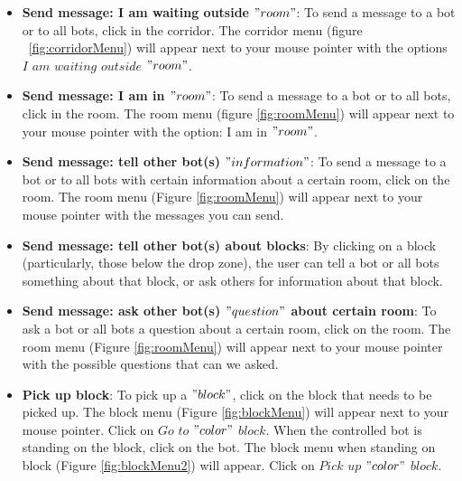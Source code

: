 \begin{itemize}
\item \textbf{Send message: I am waiting outside $"room"$}:
To send a message to a bot or to all bots, click in the corridor. The corridor menu (figure ~\ref{fig:corridorMenu}) will appear next to your mouse pointer with the options $I$ $am$ $waiting$ $outside$ $"room"$. 

\item \textbf{Send message: I am in $"room"$}:
To send a message to a bot or to all bots, click in the room. The room menu (figure \ref{fig:roomMenu}) will appear next to your mouse pointer with the option: I am in $"room"$. 

\item \textbf{Send message: tell other bot(s) $"information"$}:
To send a message to a bot or to all bots with certain information about a certain room, click on the room. The room menu (Figure \ref{fig:roomMenu}) will appear next to your mouse pointer with the messages you can send.

\item \textbf{Send message: tell other bot(s) about blocks}:
By clicking on a block (particularly, those below the drop zone), the user can tell a bot or all bots something about that block, or ask others for information about that block.

\item \textbf{Send message: ask other bot(s) $"question"$ about certain room}:
To ask a bot or all bots a question about a certain room, click on the room. The room menu (Figure \ref{fig:roomMenu}) will appear next to your mouse pointer with the possible questions that can we asked.

\item \textbf{Pick up block}:
To pick up a $"block"$, click on the block that needs to be picked up. The block menu (Figure \ref{fig:blockMenu}) will appear next to your mouse pointer. Click on $Go$ $to$ $"color"$ $block$. When the controlled bot is standing on the block, click on the bot. The block menu when standing on block (Figure \ref{fig:blockMenu2}) will appear. Click on $Pick$ $up$ $"color"$ $block$.


\end{itemize}
